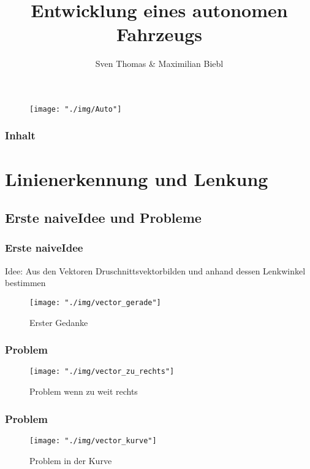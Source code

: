 \documentclass{beamer}
\title[]{Entwicklung eines autonomen Fahrzeugs}
\author{Sven Thomas \& Maximilian Biebl}
\institute[THM]{Technische Hochschule Mittelhessen}
\date{}
\begin{document}
\begin{frame}
\titlepage
\begin{center}
\begin{figure}[h]
\centering
\texttt{[image: "./img/Auto"]}
\label{fig:Auto}
\end{figure}
\end{center}
\end{frame}

\begin{frame}
\frametitle{Inhalt}
\tableofcontents
\end{frame}

\section{Linienerkennung und Lenkung}
\subsection{Erste \glqq naive\grqq Idee und Probleme}

\begin{frame}
\frametitle{Erste \glqq naive\grqq  Idee}
Idee: Aus den Vektoren \glqq Druschnittsvektor\grqq \space bilden  und anhand dessen Lenkwinkel bestimmen
\begin{center}

\begin{figure}[h]
\centering
\texttt{[image: "./img/vector\_gerade"]}
\caption{Erster Gedanke}
\label{fig:Lenkung via Vektoren in Gerade}
\end{figure}

\end{center}
\end{frame}

\begin{frame}
\frametitle{Problem}
\begin{center}
\begin{figure}[h]
\centering
\texttt{[image: "./img/vector\_zu\_rechts"]}
\caption{Problem wenn zu weit rechts}
\label{fig:Lenkung via Vektoren zu weit rechts}
\end{figure}
\end{center}
\end{frame}

\begin{frame}
\frametitle{Problem}
\begin{center}
\begin{figure}[h]
\centering
\texttt{[image: "./img/vector\_kurve"]}
\caption{Problem in der Kurve}
\label{fig:Lenkung via Vektoren in Kurve}
\end{figure}
\end{center}
\end{frame}
\end{document}
